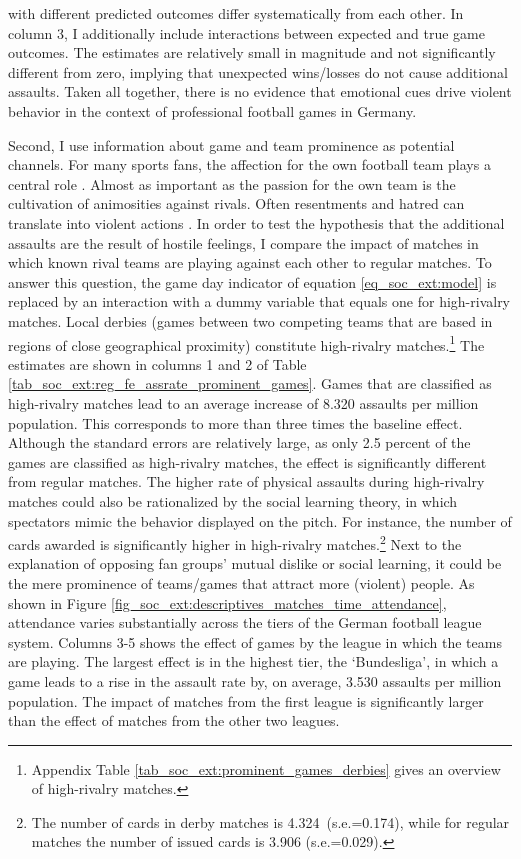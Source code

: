 with different predicted outcomes differ systematically from each other. In column 3, I additionally include interactions between expected and true game outcomes. The estimates are relatively small in magnitude and not significantly different from zero, implying that unexpected wins/losses do not cause additional assaults. Taken all together, there is no evidence that emotional cues drive violent behavior in the context of professional football games in Germany.





Second, I use information about game and team prominence as potential channels. For many sports fans, the affection for the own football team plays a central role \citep{wann1993sports}. Almost as important as the passion for the own team is the cultivation of animosities against rivals. Often resentments and hatred can translate into violent actions \citep{nassauer2011hate}. In order to test the hypothesis that the additional assaults are the result of hostile feelings, I compare the impact of matches in which known rival teams are playing against each other to regular matches. To answer this question, the game day indicator of equation \ref{eq_soc_ext:model} is replaced by an interaction with a dummy variable that equals one for high-rivalry matches. Local derbies (games between two competing teams that are based in regions of close geographical proximity) constitute high-rivalry matches.\footnote{Appendix Table \ref{tab_soc_ext:prominent_games_derbies} gives an overview of high-rivalry matches.} The estimates are shown in columns 1 and 2 of Table \ref{tab_soc_ext:reg_fe_assrate_prominent_games}. Games that are classified as high-rivalry matches lead to an average increase of 8.320 assaults per million population. This corresponds to more than three times the baseline effect. Although the standard errors are relatively large, as only 2.5 percent of the games are classified as high-rivalry matches, the effect is significantly different from regular matches. The higher rate of physical assaults during high-rivalry matches could also be rationalized by the social learning theory, in which spectators mimic the behavior displayed on the pitch. For instance, the number of cards awarded is significantly higher in high-rivalry matches.\footnote{The number of cards in derby matches is 4.324\ (s.e.=0.174), while for regular matches the number of issued cards is 3.906 (s.e.=0.029).} Next to the explanation of opposing fan groups' mutual dislike or social learning, it could be the mere prominence of teams/games that attract more (violent) people. As shown in Figure \ref{fig_soc_ext:descriptives_matches_time_attendance}, attendance varies substantially across the tiers of the German football league system. Columns 3-5 shows the effect of games by the league in which the teams are playing. The largest effect is in the highest tier, the `Bundesliga', in which a game leads to a rise in the assault rate by, on average, 3.530 assaults per million population. The impact of matches from the first league is significantly larger than the effect of matches from the other two leagues.
